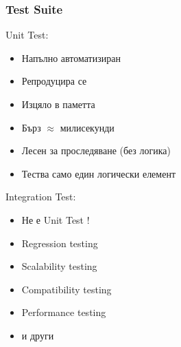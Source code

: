 \begin{frame}
  \frametitle{Test Suite}
    \begin{minipage}[t]{0.48\linewidth}
        Unit Test:
        \begin{itemize}
          \item Напълно автоматизиран 
          \item Репродуцира се 
          \item Изцяло в паметта
          \item Бърз $\approx$ милисекунди 
          \item Лесен за проследяване (без логика) 
          \item Тества само един логически елемент 
        \end{itemize}
    \end{minipage}\hfill
    \begin{minipage}[t]{0.48\linewidth}
        Integration Test:
        \begin{itemize}
          \item Не е Unit Test !
          \item Regression testing
          \item Scalability testing
          \item Compatibility testing
          \item Performance testing
          \item и други
        \end{itemize}
    \end{minipage}
\end{frame}

